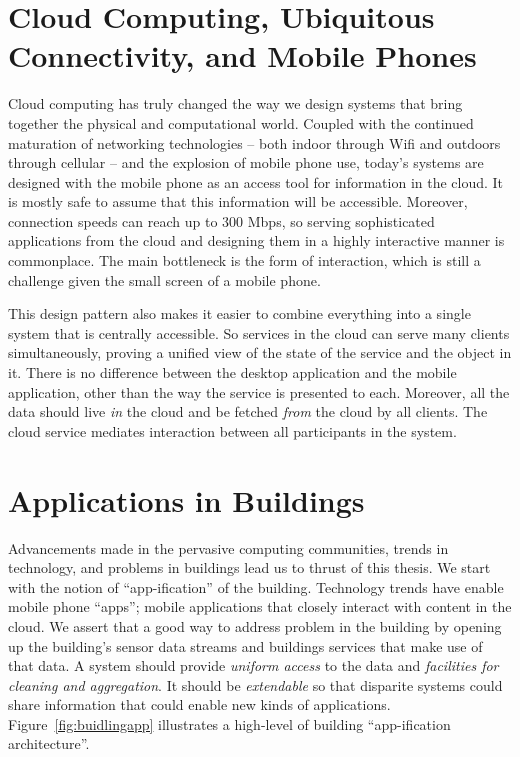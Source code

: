 

\section{Cloud Computing, Ubiquitous Connectivity, and Mobile Phones}
Cloud computing has truly changed the way we design systems that bring together the physical and computational world.  Coupled with the 
continued maturation of networking technologies -- both indoor through Wifi and outdoors through cellular -- and the explosion of mobile
phone use, today's systems are designed with the mobile phone as an access tool for information in the cloud.  It is mostly safe
to assume that this information will be accessible.  Moreover, connection speeds can reach up to 300 Mbps, so serving sophisticated
applications from the cloud and designing them in a highly interactive manner is commonplace.  The main bottleneck is the form of interaction, which
is still a challenge given the small screen of a mobile phone.

This design pattern also makes it easier to combine everything into a single system that is centrally accessible.  So services in the cloud
can serve many clients simultaneously, proving a unified view of the state of the service and the object in it.  There is no difference 
between the desktop application and the mobile application, other than the way the service is presented to each.  Moreover, all the data
should live \emph{in} the cloud and be fetched \emph{from} the cloud by all clients.  The cloud service mediates interaction between all
participants in the system.

\section{Applications in Buildings}
Advancements made in the pervasive computing communities, trends in technology, and problems in buildings lead us to thrust of this thesis.
We start with the notion of ``app-ification'' of the building.  Technology trends have enable mobile phone ``apps''; mobile
applications that closely interact with content in the cloud.  We assert that a good way to address problem in the building
by opening up the building's sensor data streams and buildings services that make use of that data.  A system should provide 
\emph{uniform access} to the data and \emph{facilities for cleaning and aggregation}.  It should be \emph{extendable}
so that disparite systems could share information that could enable new kinds of applications.  Figure~\ref{fig:buidlingapp}
illustrates a high-level of building ``app-ification architecture''.

